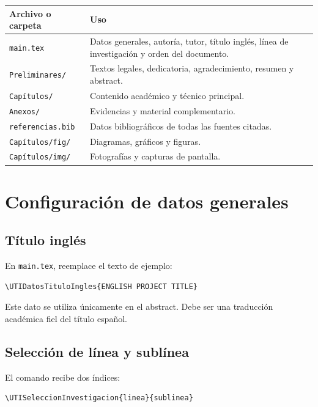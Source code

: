 \documentclass[12pt,a4paper,oneside]{report}
\begin{document}
\begin{longtable}{|p{4cm}|p{8.6cm}|}
  \hline
  \textbf{Archivo o carpeta} & \textbf{Uso} \\
  \hline
  \texttt{main.tex} & Datos generales, autoría, tutor, título inglés, línea de investigación y orden del documento. \\
  \hline
  \texttt{Preliminares/} & Textos legales, dedicatoria, agradecimiento, resumen y abstract. \\
  \hline
  \texttt{Capítulos/} & Contenido académico y técnico principal. \\
  \hline
  \texttt{Anexos/} & Evidencias y material complementario. \\
  \hline
  \texttt{referencias.bib} & Datos bibliográficos de todas las fuentes citadas. \\
  \hline
  \texttt{Capítulos/fig/} & Diagramas, gráficos y figuras. \\
  \hline
  \texttt{Capítulos/img/} & Fotografías y capturas de pantalla. \\
  \hline
\end{longtable}

\chapter{Configuración de datos generales}

\section{Título inglés}

En \texttt{main.tex}, reemplace el texto de ejemplo:

\begin{lstlisting}
\UTIDatosTituloIngles{ENGLISH PROJECT TITLE}
\end{lstlisting}

Este dato se utiliza únicamente en el abstract. Debe ser una traducción académica fiel del título español.

\section{Selección de línea y sublínea}

El comando recibe dos índices:

\begin{lstlisting}
\UTISeleccionInvestigacion{linea}{sublinea}
\end{lstlisting}
\end{document}
